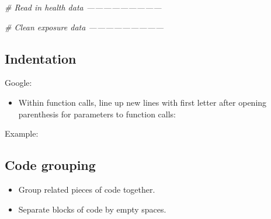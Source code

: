 \documentclass[]{book}
\makeatletter
\newenvironment{Shaded}{\begin{snugshade}}{\end{snugshade}}
\newcommand{\KeywordTok}[1]{\textcolor[rgb]{0.13,0.29,0.53}{\textbf{#1}}}
\newcommand{\DataTypeTok}[1]{\textcolor[rgb]{0.13,0.29,0.53}{#1}}
\newcommand{\DecValTok}[1]{\textcolor[rgb]{0.00,0.00,0.81}{#1}}
\newcommand{\StringTok}[1]{\textcolor[rgb]{0.31,0.60,0.02}{#1}}
\newcommand{\CommentTok}[1]{\textcolor[rgb]{0.56,0.35,0.01}{\textit{#1}}}
\newcommand{\OperatorTok}[1]{\textcolor[rgb]{0.81,0.36,0.00}{\textbf{#1}}}
\newcommand{\NormalTok}[1]{#1}
\providecommand{\tightlist}{%
  \setlength{\itemsep}{0pt}\setlength{\parskip}{0pt}}
\newenvironment{kframe}{%
\medskip{}
\setlength{\fboxsep}{.8em}
 \def\at@end@of@kframe{}%
 \ifinner\ifhmode%
  \def\at@end@of@kframe{\end{minipage}}%
  \begin{minipage}{\columnwidth}%
 \fi\fi%
 \def\FrameCommand##1{\hskip\@totalleftmargin \hskip-\fboxsep
 \colorbox{shadecolor}{##1}\hskip-\fboxsep
     \hskip-\linewidth \hskip-\@totalleftmargin \hskip\columnwidth}%
 \MakeFramed {\advance\hsize-\width
   \@totalleftmargin\z@ \linewidth\hsize
   \@setminipage}}%
 {\par\unskip\endMakeFramed%
 \at@end@of@kframe}
\renewenvironment{Shaded}{\begin{kframe}}{\end{kframe}}
\theoremstyle{definition}
\theoremstyle{definition}
\theoremstyle{definition}
\theoremstyle{remark}
\makeatother
\begin{document}
\begin{Shaded}
\begin{Highlighting}[]
\CommentTok{# Read in health data ---------------------------}

\CommentTok{# Clean exposure data ---------------------------}
\end{Highlighting}
\end{Shaded}

\subsection{Indentation}\label{indentation}

Google:

\begin{itemize}
\tightlist
\item
  Within function calls, line up new lines with first letter after
  opening parenthesis for parameters to function calls:
\end{itemize}

Example:

\begin{Shaded}
\end{Shaded}

\subsection{Code grouping}\label{code-grouping}

\begin{itemize}
\tightlist
\item
  Group related pieces of code together.
\item
  Separate blocks of code by empty spaces.
\end{itemize}

\begin{Shaded}
\end{Shaded}
\end{document}
